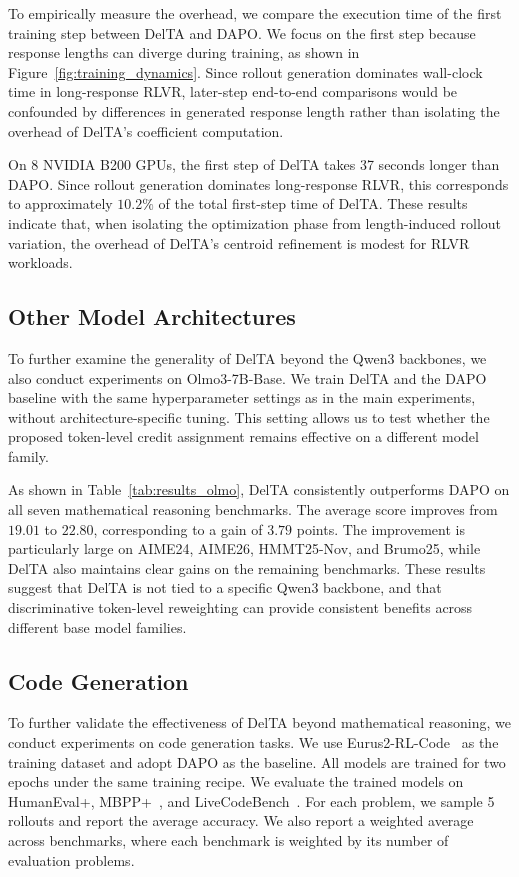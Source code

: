 \documentclass{article} %
\begin{document}
To empirically measure the overhead, we compare the execution time of the first
training step between DelTA and DAPO. We focus on the first step because response
lengths can diverge during training, as shown in Figure~\ref{fig:training_dynamics}.
Since rollout generation dominates wall-clock time in long-response RLVR, later-step
end-to-end comparisons would be confounded by differences in generated response
length rather than isolating the overhead of DelTA's coefficient computation.

On 8 NVIDIA B200 GPUs, the first step of DelTA takes 37 seconds longer than
DAPO. Since rollout generation dominates long-response RLVR, this corresponds to approximately \(10.2\%\) of the total first-step time
of DelTA. These results indicate that, when isolating the optimization phase
from length-induced rollout variation, the overhead of DelTA's centroid
refinement is modest for RLVR workloads.


\subsection{Other Model Architectures}
\label{app:other-architectures}

To further examine the generality of DelTA beyond the Qwen3 backbones, we also conduct experiments on Olmo3-7B-Base.
We train DelTA and the DAPO baseline with the same hyperparameter settings as in the main experiments, without architecture-specific tuning.
This setting allows us to test whether the proposed token-level credit assignment remains effective on a different model family.



As shown in Table~\ref{tab:results_olmo}, DelTA consistently outperforms DAPO on all seven mathematical reasoning benchmarks.
The average score improves from \(19.01\) to \(22.80\), corresponding to a gain of \(3.79\) points.
The improvement is particularly large on AIME24, AIME26, HMMT25-Nov, and Brumo25, while DelTA also maintains clear gains on the remaining benchmarks.
These results suggest that DelTA is not tied to a specific Qwen3 backbone, and that discriminative token-level reweighting can provide consistent benefits across different base model families.


\subsection{Code Generation}
\label{app:code-gen}


To further validate the effectiveness of DelTA beyond mathematical reasoning, we conduct experiments on code generation tasks. We use Eurus2-RL-Code~\citep{cui2025process} as the training dataset and adopt DAPO as the baseline. All models are trained for two epochs under the same training recipe. We evaluate the trained models on HumanEval+, MBPP+~\citep{liu2023your}, and LiveCodeBench~\citep{jain2024livecodebench}. For each problem, we sample 5 rollouts and report the average accuracy. We also report a weighted average across benchmarks, where each benchmark is weighted by its number of evaluation problems.
\end{document}
